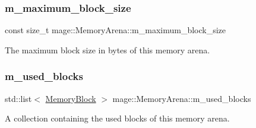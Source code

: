 \subsubsection{\texorpdfstring{m\+\_\+maximum\+\_\+block\+\_\+size}{m\_maximum\_block\_size}}
{\footnotesize\ttfamily const size\+\_\+t mage\+::\+Memory\+Arena\+::m\+\_\+maximum\+\_\+block\+\_\+size\hspace{0.3cm}{\ttfamily [private]}}

The maximum block size in bytes of this memory arena. \hypertarget{classmage_1_1_memory_arena_a49a6d7fb9396f57210897abfb4e30903}{}\label{classmage_1_1_memory_arena_a49a6d7fb9396f57210897abfb4e30903} 
\subsubsection{\texorpdfstring{m\+\_\+used\+\_\+blocks}{m\_used\_blocks}}
{\footnotesize\ttfamily std\+::list$<$ \hyperlink{classmage_1_1_memory_arena_a51f08f86660f163e2eef7c312e01700c}{Memory\+Block} $>$ mage\+::\+Memory\+Arena\+::m\+\_\+used\+\_\+blocks\hspace{0.3cm}{\ttfamily [private]}}

A collection containing the used blocks of this memory arena. 